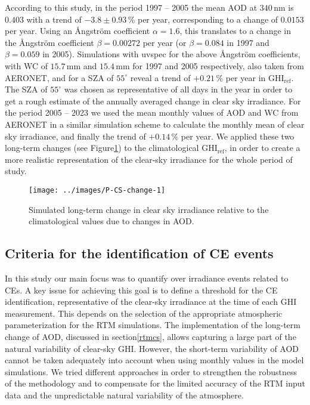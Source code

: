\documentclass[preprint, 5p,
authoryear]{elsarticle} %
\begin{document}
According to this study, in the period 1997 -- 2005 the mean AOD at
\(340\,\text{nm}\) is \(0.403\) with a trend of \(-3.8\pm0.93\,\%\) per
year, corresponding to a change of \(0.0153\) per year. Using an
Ångström coefficient \(\alpha = 1.6\), this translates to a change in
the Ångström coefficient \(\beta=0.00272\) per year (or \(\beta=0.084\)
in 1997 and \(\beta=0.059\) in 2005). Simulations with uvspec for the
above Ångström coefficients, with WC of \(15.7\,\text{mm}\) and
\(15.4\,\text{mm}\) for 1997 and 2005 respectively, also taken from
AERONET, and for a SZA of \(55^\circ\) reveal a trend of \(+0.21\,\%\)
per year in \(\text{GHI}_\text{ref}\). The SZA of \(55^\circ\) was
chosen as representative of all days in the year in order to get a rough
estimate of the annually averaged change in clear sky irradiance. For
the period 2005 -- 2023 we used the mean monthly values of AOD and WC
from AERONET in a similar simulation scheme to calculate the monthly
mean of clear sky irradiance, and finally the trend of \(+0.14\,\%\) per
year. We applied these two long-term changes (see
Figure\nobreakspace{}\ref{fig:CS-change}) to the climatological
\(\text{GHI}_\text{ref}\), in order to create a more realistic
representation of the clear-sky irradiance for the whole period of
study.

\begin{figure}

{\centering \texttt{[image: ../images/P-CS-change-1]} 

}

\caption{Simulated long-term change in clear sky irradiance relative to the climatological values due to changes in AOD.}\label{fig:CS-change}
\end{figure}

\subsection{Criteria for the identification of CE
events}\label{criteria-for-the-identification-of-ce-events}

In this study our main focus was to quantify over irradiance events
related to CEs. A key issue for achieving this goal is to define a
threshold for the CE identification, representative of the clear-sky
irradiance at the time of each GHI measurement. This depends on the
selection of the appropriate atmospheric parameterization for the RTM
simulations. The implementation of the long-term change of AOD,
discussed in section\nobreakspace{}\ref{rtmcs}, allows capturing a large
part of the natural variability of clear-sky GHI. However, the
short-term variability of AOD cannot be taken adequately into account
when using monthly values in the model simulations. We tried different
approaches in order to strengthen the robustness of the methodology and
to compensate for the limited accuracy of the RTM input data and the
unpredictable natural variability of the atmosphere.
\end{document}
